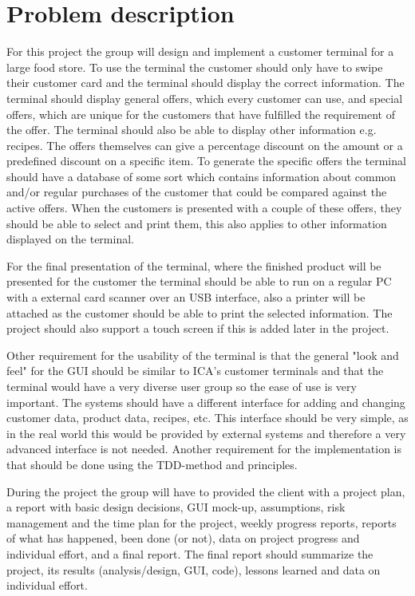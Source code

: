 \documentclass[a4paper,twoside,titlepage]{article}
\begin{document}
\section{Problem description}
For this project the group will design and implement a customer terminal for a large food store. To use the terminal the customer should only have to swipe their customer card and the terminal should display the correct information. The terminal should display general offers, which every customer can use, and special offers, which are unique for the customers that have fulfilled the requirement of the offer. The terminal should also be able to display other information e.g. recipes. The offers themselves can give a percentage discount on the amount or a predefined discount on a specific item. To generate the specific offers the terminal should have a database of some sort which contains information about common and/or regular purchases of the customer that could be compared against the active offers. When the customers is presented with a couple of these offers, they should be able to select and print them, this also applies to other information displayed on the terminal. 
     
For the final presentation of the terminal, where the finished product will be presented for the customer the terminal should be able to run on a regular PC with a external card scanner over an USB interface, also a printer will be attached as the customer should be able to print the selected information. The project should also support a touch screen if this is added later in the project.
 
Other requirement for the usability of the terminal is that the general "look and feel" for the GUI should be similar to ICA's customer terminals and that the terminal would have a very diverse user group so the ease of use is very important. The systems should have a different interface for adding and changing customer data, product data, recipes, etc. This interface should be very simple, as in the real world this would be provided by external systems and therefore a very advanced interface is not needed. Another requirement for the implementation is that should be done using the TDD-method and principles.
    
During the project the group will have to provided the client with a project plan, a report with basic design decisions, GUI mock-up, assumptions, risk management and the time plan for the project, weekly progress reports, reports of what has happened, been done (or not), data on project progress and individual effort, and a final report. The final report should summarize the project, its results (analysis/design, GUI, code), lessons learned and data on individual effort. 
    
\end{document}
